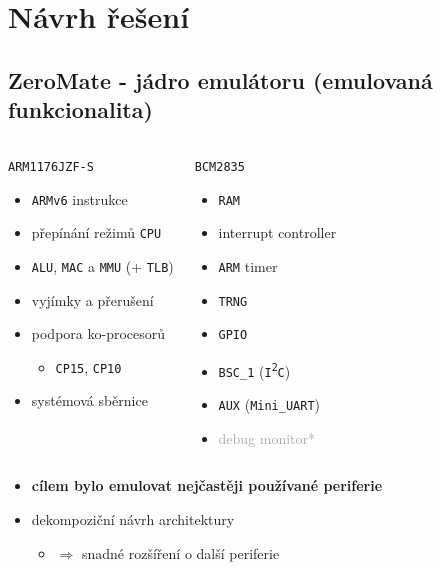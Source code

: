 \documentclass[compress]{beamer}
\begin{document}
\section{Návrh řešení}

\subsection{ZeroMate - jádro emulátoru (emulovaná funkcionalita)}

\begin{frame}
	\begin{columns}
		\begin{block}{\texttt{ARM1176JZF-S}}
			\begin{itemize}
				\item \texttt{ARMv6} instrukce
				\item přepínání režimů \texttt{CPU}
				\item \texttt{ALU}, \texttt{MAC} a \texttt{MMU} (+ \texttt{TLB})
				\item vyjímky a přerušení
				\item podpora ko-procesorů
				\begin{itemize}
					\item \texttt{CP15}, \texttt{CP10}
				\end{itemize}
				\item systémová sběrnice
			\end{itemize}
		\end{block}
		\begin{block}{\texttt{BCM2835}}
			\begin{itemize}
				\item \texttt{RAM}
				\item interrupt controller
				\item \texttt{ARM} timer
				\item \texttt{TRNG}
				\item \texttt{GPIO}
				\item \texttt{BSC\_1} (\texttt{I\textsuperscript{2}C})
				\item \texttt{AUX} (\texttt{Mini\_UART})
				\item \textcolor{darkgray}{debug monitor*} 
			\end{itemize}
		\end{block}
	\end{columns}
	\vspace{0.4cm}
	\noindent\makebox[\linewidth]{\rule{\textwidth}{0.4pt}}
	\vspace{-0.4cm}
	\begin{itemize}
		\item \textbf{cílem bylo emulovat nejčastěji používané periferie}
		\item dekompoziční návrh architektury 
		\begin{itemize}
			\item $\Rightarrow$ snadné rozšíření o další periferie
		\end{itemize}
	\end{itemize}
\end{frame}
\end{document}
